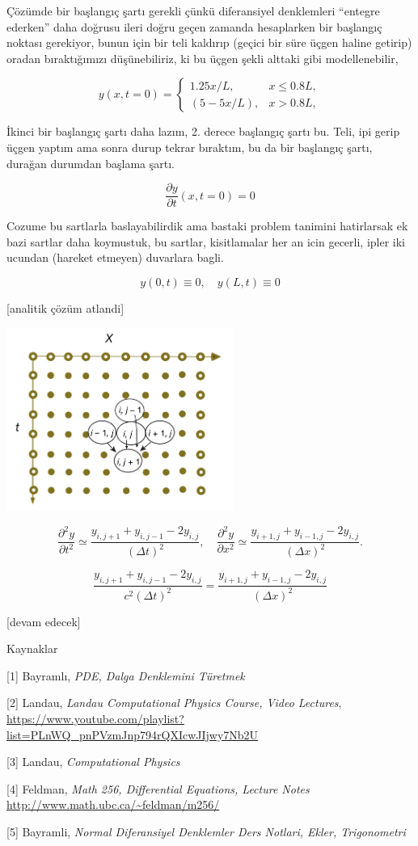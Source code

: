 \documentclass[12pt,fleqn]{article}\usepackage{../../common}
\begin{document}
Çözümde bir başlangıç şartı gerekli çünkü diferansiyel denklemleri ``entegre
ederken'' daha doğrusu ileri doğru geçen zamanda hesaplarken bir başlangıç
noktası gerekiyor, bunun için bir teli kaldırıp (geçici bir süre üçgen haline
getirip) oradan bıraktığımızı düşünebiliriz, ki bu üçgen şekli alttaki gibi
modellenebilir,

$$
y(x,t=0)=\begin{cases}
1.25 x/L , &x\leq 0.8 L ,\\
(5-5x/L), &x> 0.8 L,
\end{cases} 
$$

İkinci bir başlangıç şartı daha lazım, 2. derece başlangıç şartı bu. Teli, ipi
gerip üçgen yaptım ama sonra durup tekrar bıraktım, bu da bir başlangıç şartı,
durağan durumdan başlama şartı.

$$
\frac{\partial y} {\partial t}(x,t=0) =0
$$

Cozume bu sartlarla baslayabilirdik ama bastaki problem tanimini hatirlarsak ek
bazi sartlar daha koymustuk, bu sartlar, kisitlamalar her an icin gecerli,
ipler iki ucundan (hareket etmeyen) duvarlara bagli.

$$
y(0,t) \equiv 0, \quad y(L,t) \equiv 0
$$

[analitik çözüm atlandi]

\includegraphics[width=20em]{compscieng_app17wave_03.png}

$$
\frac{\partial^2 y }{\partial t^2} \simeq
\frac{y_{i,j+1}+y_{i,j-1}-2 y_{i,j}}{(\Delta t)^2}, \quad
\frac{\partial^2 y}{\partial x^2} \simeq
\frac{y_{i+1,j}+y_{i-1,j}-2 y_{i,j}} {(\Delta x)^2}.
$$

$$
\frac{y_{i,j+1}+y_{i,j-1}-2 y_{i,j}} {c^2 (\Delta t)^2}  =
\frac{y_{i+1,j}+y_{i-1,j}-2 y_{i,j}} {(\Delta x)^2}
$$












[devam edecek]

Kaynaklar

[1] Bayramlı, {\em PDE, Dalga Denklemini Türetmek}

[2] Landau, {\em Landau Computational Physics Course, Video Lectures},
    \url{https://www.youtube.com/playlist?list=PLnWQ_pnPVzmJnp794rQXIcwJIjwy7Nb2U}

[3] Landau, {\em Computational Physics}

[4] Feldman, {\em Math 256, Differential Equations, Lecture Notes}
    \url{http://www.math.ubc.ca/~feldman/m256/}

[5] Bayramli, {\em Normal Diferansiyel Denklemler Ders Notlari, Ekler, Trigonometri}
    
\end{document}
